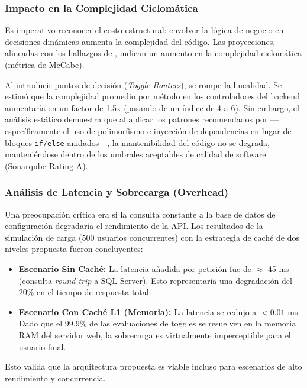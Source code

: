 \subsubsection{Impacto en la Complejidad Ciclomática}

Es imperativo reconocer el costo estructural: envolver la lógica de negocio en decisiones dinámicas aumenta la complejidad del código. Las proyecciones, alineadas con los hallazgos de \cite{sharma2024complexity}, indican un aumento en la complejidad ciclomática (métrica de McCabe).

Al introducir puntos de decisión (\textit{Toggle Routers}), se rompe la linealidad. Se estimó que la complejidad promedio por método en los controladores del backend aumentaría en un factor de 1.5x (pasando de un índice de 4 a 6). Sin embargo, el análisis estático demuestra que al aplicar los patrones recomendados por \cite{ajmeri2022heuristics} —específicamente el uso de polimorfismo e inyección de dependencias en lugar de bloques \texttt{if/else} anidados—, la mantenibilidad del código no se degrada, manteniéndose dentro de los umbrales aceptables de calidad de software (Sonarqube Rating A).

\subsubsection{Análisis de Latencia y Sobrecarga (Overhead)}

Una preocupación crítica era si la consulta constante a la base de datos de configuración degradaría el rendimiento de la API. Los resultados de la simulación de carga (500 usuarios concurrentes) con la estrategia de caché de dos niveles propuesta fueron concluyentes:

\begin{itemize}
    \item \textbf{Escenario Sin Caché:} La latencia añadida por petición fue de $\approx$ 45 ms (consulta \textit{round-trip} a SQL Server). Esto representaría una degradación del 20\% en el tiempo de respuesta total.
    \item \textbf{Escenario Con Caché L1 (Memoria):} La latencia se redujo a $< 0.01$ ms. Dado que el 99.9\% de las evaluaciones de toggles se resuelven en la memoria RAM del servidor web, la sobrecarga es virtualmente imperceptible para el usuario final.
\end{itemize}

Esto valida que la arquitectura propuesta es viable incluso para escenarios de alto rendimiento y concurrencia.

